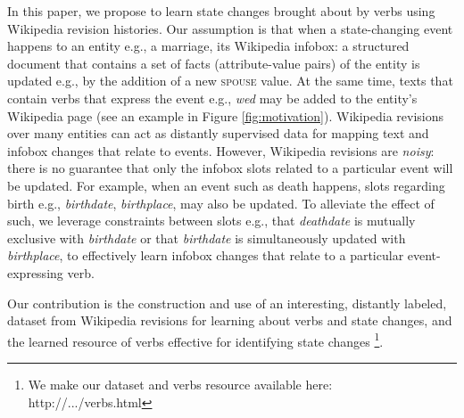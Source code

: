 In this paper, we propose to learn state changes brought about by verbs using Wikipedia revision histories. Our assumption is that when a state-changing event happens to an entity e.g., a marriage, its Wikipedia infobox: a structured document that contains a set of facts (attribute-value pairs) of the entity is updated e.g., by the addition of a new \textsc{spouse} value. At the same time, texts that contain verbs that express the event e.g., \textit{wed} may be added to the entity's Wikipedia page (see an example in Figure \ref{fig:motivation}). Wikipedia revisions over many entities can act as distantly supervised data for mapping text and infobox changes that relate to events. However, Wikipedia revisions are \textit{noisy}: there is no guarantee that only the infobox slots related to a particular event will be updated. For example, when an event such as death happens, slots regarding birth e.g., \textit{birthdate}, \textit{birthplace}, may also be updated. To alleviate the effect of such, we leverage constraints between slots e.g., that \textit{deathdate} is mutually exclusive with \textit{birthdate} or that \textit{birthdate} is simultaneously updated with \textit{birthplace}, to effectively learn infobox changes that relate to a particular event-expressing verb. 

Our contribution is the construction and use of an interesting, distantly labeled, dataset from Wikipedia revisions for learning about verbs and state changes, and the learned resource of verbs effective for identifying state changes \footnote[1]{We make our dataset and verbs resource available here: http://.../verbs.html}.